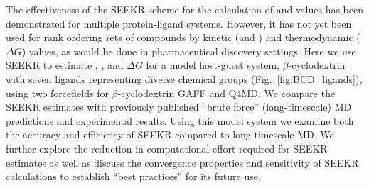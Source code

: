 
\par The effectiveness of the SEEKR scheme for the calculation of \kon and \koff 
values has been demonstrated for multiple protein-ligand systems\cite{Votapka2015,Votapka2017}.
However, it has not yet been used for rank ordering sets of compounds by kinetic 
(\kon and \koff) and thermodynamic ($\Delta G$) values, as would be done in
pharmaceutical discovery settings. Here we use SEEKR to estimate \kon , \koff, and $\Delta G$ 
for a model host-guest system, $\beta$-cyclodextrin with seven ligands 
representing diverse chemical groups (Fig.~\ref{fig:BCD_ligands}), using two  
forcefields for $\beta$-cyclodextrin  GAFF\cite{Wang2004,Wang2006} and Q4MD\cite{Cezard2011}. We compare the SEEKR estimates with previously
published ``brute force'' (long-timescale) MD predictions\cite{Tang2017} and experimental 
results\cite{Fukahori2004,Fukahori2006,Nishikawa2002,Nishikawa2006,Rekharsky1998,Barros1998}.
Using this model system we examine both the accuracy and efficiency of SEEKR compared
to long-timescale MD. We further explore the reduction in computational effort 
required for SEEKR estimates as well as discuss the convergence properties and 
sensitivity of SEEKR calculations to establish ``best practices'' for its future
use.

 


